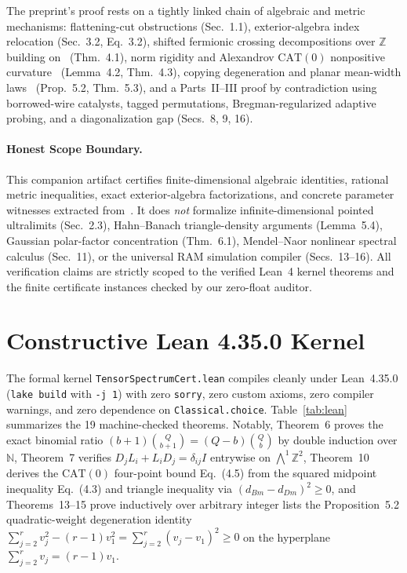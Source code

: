 \documentclass[10pt,twocolumn]{article}
\begin{document}
The preprint's proof rests on a tightly linked chain of algebraic and metric mechanisms: flattening-cut obstructions (Sec.~1.1), exterior-algebra index relocation (Sec.~3.2, Eq.~3.2), shifted fermionic crossing decompositions over $\mathbb{Z}$ building on~\cite{khoruzhii2026crossing} (Thm.~4.1), norm rigidity and Alexandrov $\mathrm{CAT}(0)$ nonpositive curvature~\cite{bridson1999metric} (Lemma~4.2, Thm.~4.3), copying degeneration and planar mean-width laws~\cite{schneider2014convex} (Prop.~5.2, Thm.~5.3), and a Parts~II--III proof by contradiction using borrowed-wire catalysts, tagged permutations, Bregman-regularized adaptive probing, and a diagonalization gap (Secs.~8, 9, 16).

\paragraph{Honest Scope Boundary.}
This companion artifact certifies finite-dimensional algebraic identities, rational metric inequalities, exact exterior-algebra factorizations, and concrete parameter witnesses extracted from~\cite{openai2026tensorspectrum}. It does \emph{not} formalize infinite-dimensional pointed ultralimits (Sec.~2.3), Hahn--Banach triangle-density arguments (Lemma~5.4), Gaussian polar-factor concentration (Thm.~6.1), Mendel--Naor nonlinear spectral calculus (Sec.~11), or the universal RAM simulation compiler (Secs.~13--16). All verification claims are strictly scoped to the verified Lean~4 kernel theorems and the finite certificate instances checked by our zero-float auditor.

\section{Constructive Lean 4.35.0 Kernel}
The formal kernel \texttt{TensorSpectrumCert.lean} compiles cleanly under Lean~4.35.0 (\texttt{lake build} with \texttt{-j 1}) with zero \texttt{sorry}, zero custom axioms, zero compiler warnings, and zero dependence on \texttt{Classical.choice}. Table~\ref{tab:lean} summarizes the 19 machine-checked theorems. Notably, Theorem~6 proves the exact binomial ratio $(b+1)\binom{Q}{b+1} = (Q-b)\binom{Q}{b}$ by double induction over $\mathbb{N}$, Theorem~7 verifies $D_j L_i + L_i D_j = \delta_{ij} I$ entrywise on $\bigwedge^1 \mathbb{Z}^2$, Theorem~10 derives the $\mathrm{CAT}(0)$ four-point bound Eq.~(4.5) from the squared midpoint inequality Eq.~(4.3) and triangle inequality via $(d_{Bm}-d_{Dm})^2 \ge 0$, and Theorems~13--15 prove inductively over arbitrary integer lists the Proposition~5.2 quadratic-weight degeneration identity $\sum_{j=2}^r v_j^2 - (r-1)v_1^2 = \sum_{j=2}^r (v_j - v_1)^2 \ge 0$ on the hyperplane $\sum_{j=2}^r v_j = (r-1)v_1$.
\end{document}

